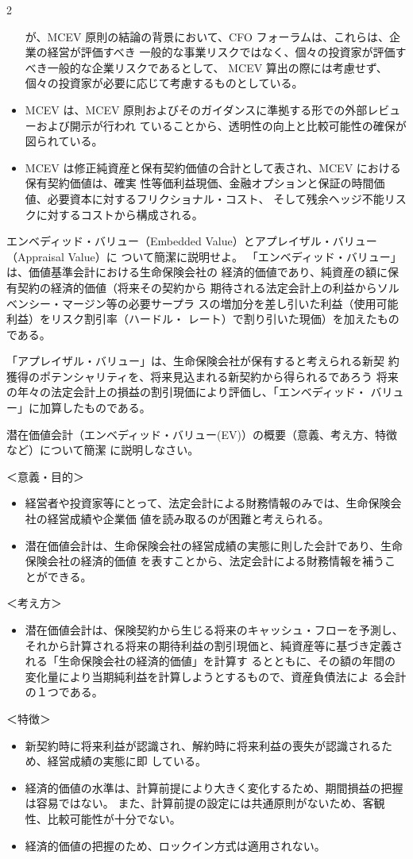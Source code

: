 2\documentclass[report,gutter=10mm,fore-edge=10mm,uplatex,dvipdfmx]{jlreq}
\begin{document}
\begin{itemize}
が、MCEV 原則の結論の背景において、CFO フォーラムは、これらは、企業の経営が評価すべき
一般的な事業リスクではなく、個々の投資家が評価すべき一般的な企業リスクであるとして、
MCEV 算出の際には考慮せず、個々の投資家が必要に応じて考慮するものとしている。
\item[] MCEV は、MCEV 原則およびそのガイダンスに準拠する形での外部レビューおよび開示が行われ
ていることから、透明性の向上と比較可能性の確保が図られている。
\item[] MCEV は修正純資産と保有契約価値の合計として表され、MCEV における保有契約価値は、確実
性等価利益現価、金融オプションと保証の時間価値、必要資本に対するフリクショナル・コスト、
そして残余ヘッジ不能リスクに対するコストから構成される。
\end{itemize}

エンベディッド・バリュー（Embedded Value）とアプレイザル・バリュー（Appraisal Value）に
ついて簡潔に説明せよ。
\answer{}
「エンベディッド・バリュー」は、価値基準会計における生命保険会社の
経済的価値であり、純資産の額に保有契約の経済的価値（将来その契約から
期待される法定会計上の利益からソルベンシー・マージン等の必要サープラ
スの増加分を差し引いた利益（使用可能利益）をリスク割引率（ハードル・
レート）で割り引いた現価）を加えたものである。

「アプレイザル・バリュー」は、生命保険会社が保有すると考えられる新契
約獲得のポテンシャリティを、将来見込まれる新契約から得られるであろう
将来の年々の法定会計上の損益の割引現価により評価し、「エンベディッド・
バリュー」に加算したものである。

潜在価値会計（エンベディッド・バリュー(EV)）の概要（意義、考え方、特徴など）について簡潔
に説明しなさい。

\answer{}
＜意義・目的＞
\begin{itemize}
 \item[] 経営者や投資家等にとって、法定会計による財務情報のみでは、生命保険会社の経営成績や企業価 値を読み取るのが困難と考えられる。
 \item[] 潜在価値会計は、生命保険会社の経営成績の実態に則した会計であり、生命保険会社の経済的価値 を表すことから、法定会計による財務情報を補うことができる。
\end{itemize}
＜考え方＞
\begin{itemize}
 \item[] 潜在価値会計は、保険契約から生じる将来のキャッシュ・フローを予測し、それから計算される将来の期待利益の割引現価と、純資産等に基づき定義される「生命保険会社の経済的価値」を計算す
 るとともに、その額の年間の変化量により当期純利益を計算しようとするもので、資産負債法によ
 る会計の１つである。
\end{itemize}
＜特徴＞
\begin{itemize}
 \item[] 新契約時に将来利益が認識され、解約時に将来利益の喪失が認識されるため、経営成績の実態に即 している。
 \item[] 経済的価値の水準は、計算前提により大きく変化するため、期間損益の把握は容易ではない。
また、計算前提の設定には共通原則がないため、客観性、比較可能性が十分でない。
 \item[] 経済的価値の把握のため、ロックイン方式は適用されない。
\end{itemize}
\end{document}
